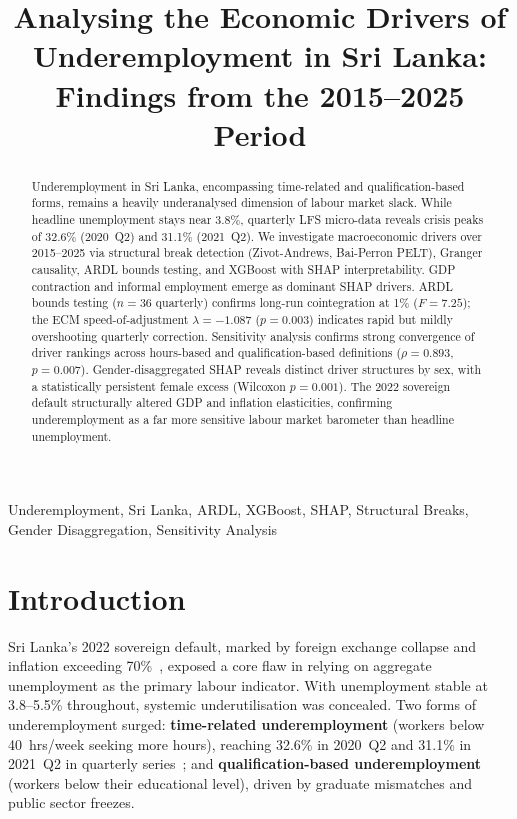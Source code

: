 \documentclass[conference]{IEEEtran}
\begin{document}
\title{Analysing the Economic Drivers of Underemployment in Sri Lanka:
Findings from the 2015--2025 Period}

\author{
}

\maketitle

\begin{abstract}
Underemployment in Sri Lanka, encompassing time-related and
qualification-based forms, remains a heavily underanalysed dimension of
labour market slack. While headline unemployment stays near 3.8\%,
quarterly LFS micro-data reveals crisis peaks of 32.6\% (2020~Q2) and
31.1\% (2021~Q2). We investigate macroeconomic drivers over 2015--2025 via
structural break detection (Zivot-Andrews, Bai-Perron PELT), Granger
causality, ARDL bounds testing, and XGBoost with SHAP interpretability.
GDP contraction and informal employment emerge as dominant SHAP drivers.
ARDL bounds testing ($n{=}36$ quarterly) confirms long-run cointegration
at 1\% ($F{=}7.25$); the ECM speed-of-adjustment $\lambda{=}{-1.087}$
($p{=}0.003$) indicates rapid but mildly overshooting quarterly
correction. Sensitivity analysis confirms strong convergence of driver
rankings across hours-based and qualification-based definitions
($\rho = 0.893$, $p = 0.007$). Gender-disaggregated SHAP reveals
distinct driver structures by sex, with a statistically persistent female
excess (Wilcoxon $p = 0.001$). The 2022 sovereign default structurally
altered GDP and inflation elasticities, confirming underemployment as a
far more sensitive labour market barometer than headline unemployment.
\end{abstract}

\begin{IEEEkeywords}
Underemployment, Sri Lanka, ARDL, XGBoost, SHAP, Structural Breaks,
Gender Disaggregation, Sensitivity Analysis
\end{IEEEkeywords}

\section{Introduction}

Sri Lanka's 2022 sovereign default, marked by foreign exchange collapse
and inflation exceeding 70\%~\cite{cbsl2025}, exposed a core flaw in
relying on aggregate unemployment as the primary labour indicator. With
unemployment stable at 3.8--5.5\% throughout, systemic underutilisation
was concealed. Two forms of underemployment surged: \textbf{time-related
underemployment} (workers below 40~hrs/week seeking more hours), reaching
32.6\% in 2020~Q2 and 31.1\% in 2021~Q2 in quarterly series~\cite{dcs2025};
and \textbf{qualification-based underemployment} (workers below their
educational level), driven by graduate mismatches and public sector
freezes.
\end{document}
